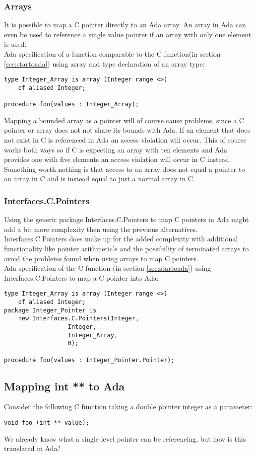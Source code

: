 \subsubsection{Arrays}
It is possible to map a C pointer directly to an Ada array. An array in Ada can even be used to reference a single value pointer if an array with only one element is used.
\\
Ada specification of a function comparable to the C function(in section \ref{sec:startoada})  using array and type declaration of an array type:
\begin{lstlisting}
type Integer_Array is array (Integer range <>) 
	of aliased Integer;

procedure foo(values : Integer_Array);
\end{lstlisting}
Mapping a bounded array as a pointer will of course cause problems, since a C pointer or array does not not share its bounds with Ada. If an element that does not exist in C is referenced in Ada an access violation will occur. This of course works both ways so if C is expecting an array with ten elements and Ada provides one with five elements an access violation will occur in C instead.
\\
Something worth nothing is that access to an array does not equal a pointer to an array in C and is instead equal to just a normal array in C.
\subsubsection{Interfaces.C.Pointers}
Using the generic package Interfaces.C.Pointers to map C pointers in Ada might add a bit more complexity then using the previous alternatives. Interfaces.C.Pointers does make up for the added complexity with additional functionality like pointer arithmetic's and the possibility of terminated arrays to avoid the problems found when using arrays to map C pointers.
\\
Ada specification of the C function (in section \ref{sec:startoada}) using Interfaces.C.Pointers to map a C pointer into Ada:
\begin{lstlisting}
type Integer_Array is array (Integer range <>) 
	of aliased Integer;
package Integer_Pointer is 
	new Interfaces.C.Pointers(Integer, 
				  Integer, 
				  Integer_Array, 
				  0);

procedure foo(values : Integer_Pointer.Pointer);
\end{lstlisting}
\subsection{Mapping int ** to Ada}
Consider the following C function taking a double pointer integer as a parameter:
\begin{lstlisting}
void foo (int ** value);
\end{lstlisting}
We already know what a single level pointer can be referencing, but how is this translated in Ada?
